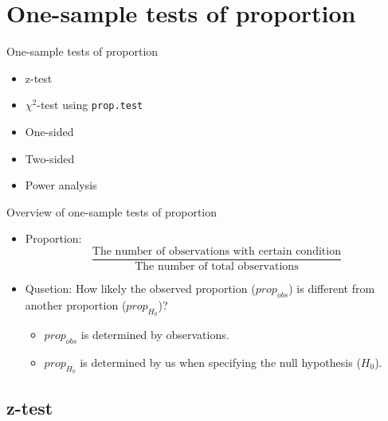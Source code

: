 \documentclass[12pt, t, xcolor=dvipsnames]{beamer}
\newcommand{\code}[1]{\colorbox{codegray}{\textcolor{black!95}{\texttt{#1}}}}
\begin{document}
\section{One-sample tests of proportion}

\begin{frame}{One-sample tests of proportion}
\begin{itemize}
  \item z-test
  \item $\chi^2$-test using \code{prop.test}
  \item One-sided
  \item Two-sided
  \item Power analysis
  
\end{itemize}

\end{frame}

\begin{frame}{Overview of one-sample tests of proportion}
\begin{itemize}
  \item Proportion: $$\frac{\text{The number of observations with certain condition}}{\text{The number of total observations}}$$
  \item Qusetion: How likely the observed proportion ($prop_{obs}$) is different from another proportion ($prop_{H_0}$)?
  \begin{itemize}
    \item $prop_{obs}$ is determined by observations.
    \item $prop_{H_0}$ is determined by us when specifying the null hypothesis ($H_0$).
  \end{itemize}
  
\end{itemize}
\end{frame}


\subsection{z-test}
\end{document}
